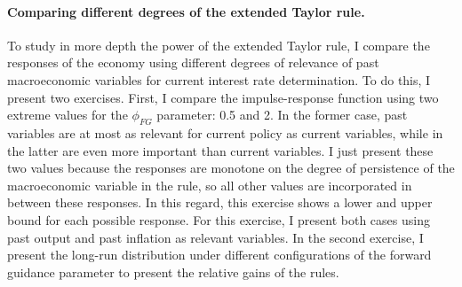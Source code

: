 \documentclass[12pt]{article}
\numberwithin{equation}{section}
\begin{document}
\paragraph{Comparing different degrees of the extended Taylor rule.} To study in more depth the power of the extended Taylor rule, I compare the responses of the economy using different degrees of relevance of past macroeconomic variables for current interest rate determination. To do this, I present two exercises. First, I compare the impulse-response function using two extreme values for the $\phi_{FG}$ parameter: 0.5 and 2. In the former case, past variables are at most as relevant for current policy as current variables, while in the latter are even more important than current variables. I just present these two values because the responses are monotone on the degree of persistence of the macroeconomic variable in the rule, so all other values are incorporated in between these responses. In this regard, this exercise shows a lower and upper bound for each possible response. For this exercise, I present both cases using past output and past inflation as relevant variables. In the second exercise, I present the long-run distribution under different configurations of the forward guidance parameter to present the relative gains of the rules.
\end{document}
